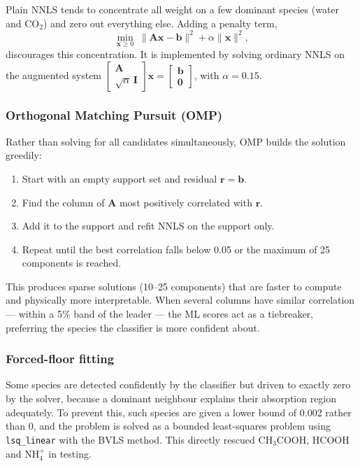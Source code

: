 \documentclass[11pt,a4paper]{article}
\newcommand{\code}[1]{\texttt{\small #1}}
\newcommand{\cotwo}{CO$_2$}
\newcommand{\nhfour}{NH$_4^+$}
\begin{document}
Plain NNLS tends to concentrate all weight on a few dominant species
(water and \cotwo) and zero out everything else. Adding a penalty term,
\[
  \min_{\mathbf{x}\ge 0}\;
  \|\mathbf{A}\mathbf{x}-\mathbf{b}\|^2 + \alpha\|\mathbf{x}\|^2 ,
\]
discourages this concentration. It is implemented by solving ordinary NNLS
on the augmented system
$\left[\begin{smallmatrix}\mathbf{A}\\ \sqrt{\alpha}\,\mathbf{I}
\end{smallmatrix}\right]\mathbf{x} =
\left[\begin{smallmatrix}\mathbf{b}\\ \mathbf{0}\end{smallmatrix}\right]$,
with $\alpha = 0.15$.

\subsubsection*{Orthogonal Matching Pursuit (OMP)}

Rather than solving for all candidates simultaneously, OMP builds the
solution greedily:

\begin{enumerate}
  \item Start with an empty support set and residual $\mathbf{r} =
        \mathbf{b}$.
  \item Find the column of $\mathbf{A}$ most positively correlated with
        $\mathbf{r}$.
  \item Add it to the support and refit NNLS on the support only.
  \item Repeat until the best correlation falls below 0.05 or the maximum
        of 25 components is reached.
\end{enumerate}

This produces sparse solutions (10--25 components) that are faster to
compute and physically more interpretable. When several columns have
similar correlation --- within a 5\% band of the leader --- the ML scores
act as a tiebreaker, preferring the species the classifier is more
confident about.

\subsubsection*{Forced-floor fitting}

Some species are detected confidently by the classifier but driven to
exactly zero by the solver, because a dominant neighbour explains their
absorption region adequately. To prevent this, such species are given a
lower bound of 0.002 rather than 0, and the problem is solved as a bounded
least-squares problem using \code{lsq\_linear} with the BVLS method. This
directly rescued CH$_3$COOH, HCOOH and \nhfour{} in testing.
\end{document}
